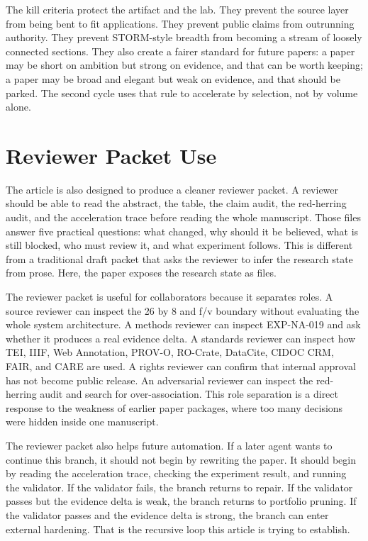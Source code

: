 \documentclass[sigconf,nonacm]{acmart}
\begin{document}
The kill criteria protect the artifact and the lab. They prevent the source
layer from being bent to fit applications. They prevent public claims from
outrunning authority. They prevent STORM-style breadth from becoming a stream of
loosely connected sections. They also create a fairer standard for future
papers: a paper may be short on ambition but strong on evidence, and that can be
worth keeping; a paper may be broad and elegant but weak on evidence, and that
should be parked. The second cycle uses that rule to accelerate by selection,
not by volume alone.

\section{Reviewer Packet Use}
The article is also designed to produce a cleaner reviewer packet. A reviewer
should be able to read the abstract, the table, the claim audit, the red-herring
audit, and the acceleration trace before reading the whole manuscript. Those
files answer five practical questions: what changed, why should it be believed,
what is still blocked, who must review it, and what experiment follows. This is
different from a traditional draft packet that asks the reviewer to infer the
research state from prose. Here, the paper exposes the research state as files.

The reviewer packet is useful for collaborators because it separates roles. A
source reviewer can inspect the 26 by 8 and f/v boundary without evaluating the
whole system architecture. A methods reviewer can inspect EXP-NA-019 and ask
whether it produces a real evidence delta. A standards reviewer can inspect how
TEI, IIIF, Web Annotation, PROV-O, RO-Crate, DataCite, CIDOC CRM, FAIR, and CARE
are used. A rights reviewer can confirm that internal approval has not become
public release. An adversarial reviewer can inspect the red-herring audit and
search for over-association. This role separation is a direct response to the
weakness of earlier paper packages, where too many decisions were hidden inside
one manuscript.

The reviewer packet also helps future automation. If a later agent wants to
continue this branch, it should not begin by rewriting the paper. It should
begin by reading the acceleration trace, checking the experiment result, and
running the validator. If the validator fails, the branch returns to repair. If
the validator passes but the evidence delta is weak, the branch returns to
portfolio pruning. If the validator passes and the evidence delta is strong, the
branch can enter external hardening. That is the recursive loop this article is
trying to establish.
\end{document}
